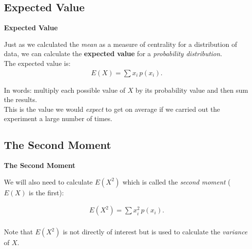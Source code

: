 \documentclass[compress]{beamer}        %
\makeatletter
\newcommand{\tcb}{\textcolor{beamer@blendedblue}}
\makeatother
\begin{document}
\subsection{Expected Value}
\begin{frame}{\bf \tcb{Expected Value}}

Just as we calculated the \emph{mean} as a measure of centrality for a distribution of data, we can calculate the {\bf expected value} for a \emph{probability distribution}.\\[0.5cm]

The expected value is:
\begin{align*}
\boxed{E(X) = \sum x_i \, p(x_i)}.
\end{align*}

In words: multiply each possible value of $X$ by its probability value and then sum the results.\\[0.5cm]

This is the value we would \emph{expect} to get on average if we carried out the experiment a large number of times.

\end{frame}



\subsection{The Second Moment}
\begin{frame}{\bf \tcb{The Second Moment}}

We will also need to calculate $E(X^2)$ which is called the \emph{second moment} ($E(X)$ is the first):

\begin{align*}
\boxed{E(X^2) = \sum x_i^2 \, p(x_i)}.\\
\end{align*}

Note that $E(X^2)$ is not directly of interest but is used to calculate the \emph{variance} of $X$.


\end{frame}
\end{document}

